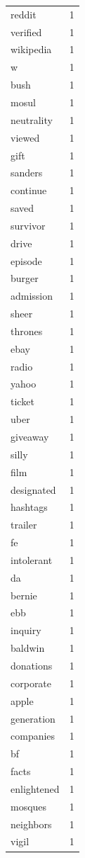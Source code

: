 \begin{tabular}{lr}
reddit & 1 \\
verified & 1 \\
wikipedia & 1 \\
w & 1 \\
bush & 1 \\
mosul & 1 \\
neutrality & 1 \\
viewed & 1 \\
gift & 1 \\
sanders & 1 \\
continue & 1 \\
saved & 1 \\
survivor & 1 \\
drive & 1 \\
episode & 1 \\
burger & 1 \\
admission & 1 \\
sheer & 1 \\
thrones & 1 \\
ebay & 1 \\
radio & 1 \\
yahoo & 1 \\
ticket & 1 \\
uber & 1 \\
giveaway & 1 \\
silly & 1 \\
film & 1 \\
designated & 1 \\
hashtags & 1 \\
trailer & 1 \\
fe & 1 \\
intolerant & 1 \\
da & 1 \\
bernie & 1 \\
ebb & 1 \\
inquiry & 1 \\
baldwin & 1 \\
donations & 1 \\
corporate & 1 \\
apple & 1 \\
generation & 1 \\
companies & 1 \\
bf & 1 \\
facts & 1 \\
enlightened & 1 \\
mosques & 1 \\
neighbors & 1 \\
vigil & 1 \\

\end{tabular}
